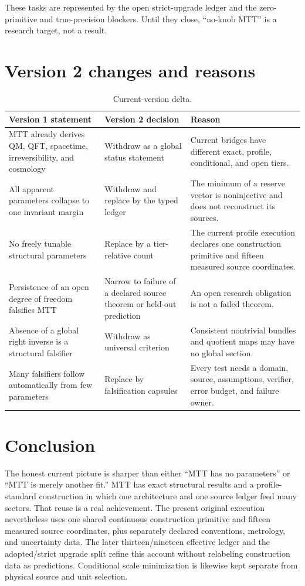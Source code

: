 \documentclass[11pt]{article}
\begin{document}
These tasks are represented by the open strict-upgrade ledger and the
zero-primitive and true-precision blockers. Until they close, ``no-knob MTT''
is a research target, not a result.

\section{Version 2 changes and reasons}

\begin{table}[ht]
\centering
\small
\begin{tabularx}{\textwidth}{@{}p{3.2cm}p{4.6cm}X@{}}
\toprule
Version 1 statement & Version 2 decision & Reason \\
\midrule
MTT already derives QM, QFT, spacetime, irreversibility, and cosmology &
Withdraw as a global status statement &
Current bridges have different exact, profile, conditional, and open tiers. \\
All apparent parameters collapse to one invariant margin &
Withdraw and replace by the typed ledger &
The minimum of a reserve vector is noninjective and does not reconstruct its
sources. \\
No freely tunable structural parameters &
Replace by a tier-relative count &
The current profile execution declares one construction primitive and fifteen
measured source coordinates. \\
Persistence of an open degree of freedom falsifies MTT &
Narrow to failure of a declared source theorem or held-out prediction &
An open research obligation is not a failed theorem. \\
Absence of a global right inverse is a structural falsifier &
Withdraw as universal criterion &
Consistent nontrivial bundles and quotient maps may have no global section. \\
Many falsifiers follow automatically from few parameters &
Replace by falsification capsules &
Every test needs a domain, source, assumptions, verifier, error budget, and
failure owner. \\
\bottomrule
\end{tabularx}
\caption{Current-version delta.}
\end{table}

\section{Conclusion}

The honest current picture is sharper than either ``MTT has no parameters''
or ``MTT is merely another fit.'' MTT has exact structural results and a
profile-standard construction in which one architecture and one source
ledger feed many sectors. That reuse is a real achievement. The present
original execution nevertheless uses one shared continuous construction primitive and
fifteen measured source coordinates, plus separately declared conventions,
metrology, and uncertainty data. The later thirteen/nineteen effective ledger
and the adopted/strict upgrade split refine this account without relabeling
construction data as predictions. Conditional scale minimization is likewise
kept separate from physical source and unit selection.
\end{document}
